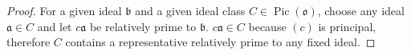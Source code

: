 \documentclass[10pt]{article}
\newcommand{\p}{\mathfrak{p}}
\newcommand{\q}{\mathfrak{q}}
\renewcommand{\a}{\mathfrak{a}}
\renewcommand{\b}{\mathfrak{b}}
\renewcommand{\o}{\mathfrak{o}}
\let\ker\relax
\DeclareMathOperator*{\ker}{Ker}
\DeclareMathOperator*{\Pic}{Pic}
\begin{document}
\begin{enumerate}
\begin{proof}
For a given ideal $\b$ and a given ideal class $C \in \Pic(\o)$, choose any ideal $\a \in C$ and let $c\a$ be relatively prime to $\b$.  $c\a \in C$ because $(c)$ is principal, therefore $C$ contains a representative relatively prime to any fixed ideal.
\end{proof}

\setcounter{enumi}{10}
\begin{comment}
\item Let $M$ be a finitely generated torsion-free module over $\o$.  Prove that $M$ is projective.

\begin{proof}

Given a prime ideal $\p$, the localized module $M_\p$ is generated over $\o_\p$ by any generating set of $M$ over $\o$, hence is finitely generated.  If $\frac{a}{s}m = 0$ for some $m \in M_\p$, then multiplication by $s$ gives that $am = 0$.  Thus, since $M$ is torsion free, $a=0$ or $m=0$, so $M_\p$ is also torsion free.  $\o_\p$ is a principal ideal domain by the combination of exercises 15 and 16: there is a unique prime ideal $\q$ of $\o_\p$, so every ideal factors as $\q^k$ for some $k$; but there is some $t \in \q \setminus \q^2$, hence $\q = (t)$ is principal, and so every ideal is principal of the form $(t^k)$.  By Theorem 7.3, $M_\p$ is free and therefore projective.

Let $F$ be finite free over $\o$ and $f:F \rightarrow M$ surjective.  $f$ extends naturally to a homomorphism $f_\p:F_\p \rightarrow M_\p$ by $f_\p(\frac{a}{s}x) = \frac{a}{s}f(x)$ for $s \not \in \p$, which is surjective because every element of $M_\p$ is of the form $\frac{a}{s}m$ for some $m \in M$.  So the sequence
$$
\begin{tikzcd}
0 \arrow[r]& \ker f_\p \arrow[r] & F_\p \arrow[r, "f_\p"'] & M_\p \arrow[r] \arrow[l, bend right, "g_\p"'] & 0
\end{tikzcd}
$$
is exact, hence it yields a splitting homomorphism $g_\p$.

As a homomorphism of $\o_\p$-modules, $g_\p$ is naturally a homomorphism of $\o$-modules as well.  Since it is a right inverse for $f_\p$, it is injective, hence gives an embedding $g_\p(M)$ of $M$ into $F_\p$ (as an $\o$-module).  This embedding has a finite generating set $\{m_1, \dots , m_n\}$, and for each $i$ there is some $c_i \not \in \p$ for which $c_i m_i \in F$.  Let $c_\p$ be the product of all the $c_i$.  We know $c_\p \not \in \p$ since $\p^c$ is multiplicative, and that $c_\p m_i \in F$ for all $i$.  Thus $c_\p g_p(M) \subseteq F$.


\end{comment}
\end{enumerate}
\end{document}
